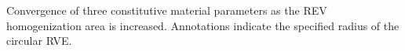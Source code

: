 \label{fig:revconverge} Convergence of three constitutive material parameters as the REV homogenization area is increased. Annotations indicate the specified radius of the circular RVE.